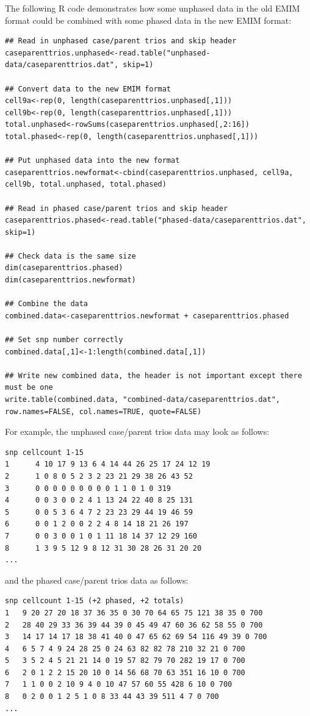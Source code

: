 \documentclass[a4paper,12pt]{article}
\begin{document}
The following R code demonstrates how some unphased data in the old EMIM format could be combined with some phased data in the new EMIM format: 
\vspace{0.35cm} \begin{lstlisting}
## Read in unphased case/parent trios and skip header
caseparenttrios.unphased<-read.table("unphased-data/caseparenttrios.dat", skip=1)

## Convert data to the new EMIM format
cell9a<-rep(0, length(caseparenttrios.unphased[,1]))
cell9b<-rep(0, length(caseparenttrios.unphased[,1]))
total.unphased<-rowSums(caseparenttrios.unphased[,2:16])
total.phased<-rep(0, length(caseparenttrios.unphased[,1]))

## Put unphased data into the new format
caseparenttrios.newformat<-cbind(caseparenttrios.unphased, cell9a, cell9b, total.unphased, total.phased) 

## Read in phased case/parent trios and skip header
caseparenttrios.phased<-read.table("phased-data/caseparenttrios.dat", skip=1)

## Check data is the same size
dim(caseparenttrios.phased)
dim(caseparenttrios.newformat)

## Combine the data
combined.data<-caseparenttrios.newformat + caseparenttrios.phased

## Set snp number correctly
combined.data[,1]<-1:length(combined.data[,1])

## Write new combined data, the header is not important except there must be one
write.table(combined.data, "combined-data/caseparenttrios.dat", row.names=FALSE, col.names=TRUE, quote=FALSE)

\end{lstlisting} \vspace{0.35cm}
For example, the unphased case/parent trios data may look as follows: 
\vspace{0.35cm} \begin{lstlisting}
snp	cellcount 1-15
1      4 10 17 9 13 6 4 14 44 26 25 17 24 12 19
2      1 0 8 0 5 2 3 2 23 21 29 38 26 43 52
3      0 0 0 0 0 0 0 0 0 1 1 0 1 0 319
4      0 0 3 0 0 2 4 1 13 24 22 40 8 25 131
5      0 0 5 3 6 4 7 2 23 23 29 44 19 46 59
6      0 0 1 2 0 0 2 2 4 8 14 18 21 26 197
7      0 0 3 0 0 1 0 1 11 18 14 37 12 29 160
8      1 3 9 5 12 9 8 12 31 30 28 26 31 20 20
...

\end{lstlisting} \vspace{0.35cm}
and the phased case/parent trios data as follows: 
\vspace{0.35cm} \begin{lstlisting}
snp	cellcount 1-15 (+2 phased, +2 totals)
1	9 20 27 20 18 37 36 35 0 30 70 64 65 75 121 38 35 0 700
2	28 40 29 33 36 39 44 39 0 45 49 47 60 36 62 58 55 0 700
3	14 17 14 17 18 38 41 40 0 47 65 62 69 54 116 49 39 0 700
4	6 5 7 4 9 24 28 25 0 24 63 82 82 78 210 32 21 0 700
5	3 5 2 4 5 21 21 14 0 19 57 82 79 70 282 19 17 0 700
6	2 0 1 2 2 15 20 10 0 14 56 68 70 63 351 16 10 0 700
7	1 1 0 0 2 10 9 4 0 10 47 57 60 55 428 6 10 0 700
8	0 2 0 0 1 2 5 1 0 8 33 44 43 39 511 4 7 0 700
...

\end{lstlisting} \vspace{0.35cm}
\end{document}

